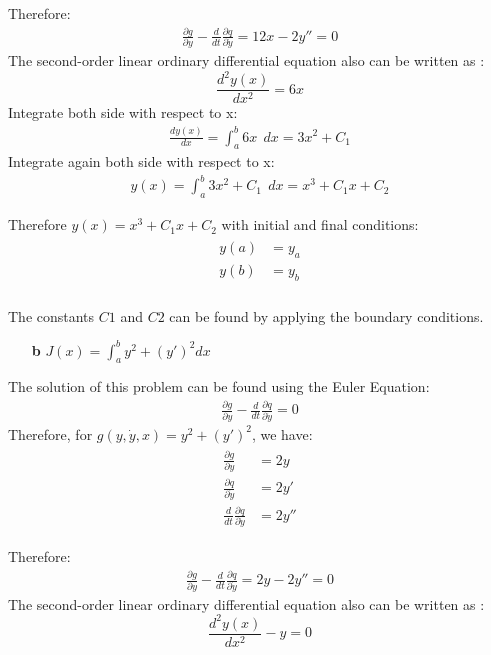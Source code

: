 \documentclass{article}
\begin{document}
Therefore:
\begin{eqnarray*}
\frac{\partial g}{\partial y} - \frac{d}{dt}\frac{\partial q}{\partial \dot{y}} = 12x - 2y'' = 0
\end{eqnarray*}
The second-order linear ordinary differential equation also can be written as : 
\begin{equation}
\frac{d^2y(x)}{dx^2} = 6x
\end{equation}
Integrate both side with respect to x:
\begin{eqnarray*}
\frac{dy(x)}{dx} = \int_{a}^{b} 6x \:\:dx = 3x^2 + C_1
\end{eqnarray*}
Integrate again both side with respect to x:
\begin{eqnarray*}
y(x) = \int_{a}^{b} 3x^2 + C_1 \:\:dx = x^3 + C_1x + C_2
\end{eqnarray*}

Therefore $y(x) = x^3 + C_1x + C_2 $ with initial and final conditions:
\begin{eqnarray*}
\begin{split}
y(a) &= y_a \\
y(b) &= y_b \\
\end{split}
\end{eqnarray*}

The constants $C 1$ and $C 2$ can be found by applying the boundary conditions.

\begin{enumerate}
\item[\textbf{b}] $ J(x) = \int_{a}^{b} y^2 + (y')^2 dx $  
\end{enumerate}

The solution of this problem can be found using the Euler Equation:
\begin{eqnarray}
\frac{\partial g}{\partial y} - \frac{d}{dt}\frac{\partial q}{\partial \dot{y}} = 0
\end{eqnarray}
Therefore, for $g(y,\dot{y}, x) = y^2 + (y')^2 $, we have:
\begin{eqnarray*}
\begin{split}
\frac{\partial g}{\partial y} &= 2y \\
\frac{\partial q}{\partial \dot{y}} &= 2y' \\
\frac{d}{dt}\frac{\partial q}{\partial \dot{y}} &= 2y''
\end{split}
\end{eqnarray*}

Therefore:
\begin{eqnarray*}
\frac{\partial g}{\partial y} - \frac{d}{dt}\frac{\partial q}{\partial \dot{y}} = 2y - 2y'' = 0
\end{eqnarray*}
The second-order linear ordinary differential equation also can be written as : 
\begin{equation}
\frac{d^2y(x)}{dx^2} - y = 0
\end{equation}
\end{document}
